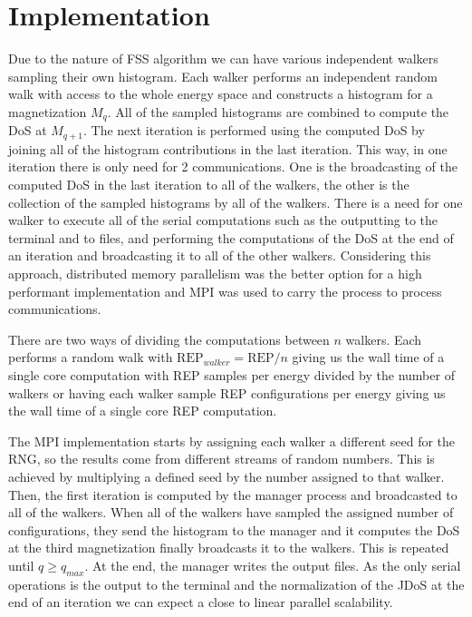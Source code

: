 \section{Implementation}

	Due to the nature of FSS algorithm we can have various independent walkers sampling their own histogram. Each walker performs an independent random walk with access to the whole energy space and constructs a histogram for a magnetization $M_q$. All of the sampled histograms are combined to compute the DoS at $M_{q+1}$. The next iteration is performed using the computed DoS by joining all of the histogram contributions in the last iteration.
This way, in one iteration there is only need for 2 communications. One is the broadcasting of the computed DoS in the last iteration to all of the walkers, the other is the collection of the sampled histograms by all of the walkers. There is a need for one walker to execute all of the serial computations such as the outputting to the terminal and to files, and performing the computations of the DoS at the end of an iteration and broadcasting it to all of the other walkers. Considering this approach, distributed memory parallelism was the better option for a high performant implementation and MPI was used to carry the process to process communications.

	There are two ways of dividing the computations between $n$ walkers. Each performs a random walk with $\text{REP}_{walker} = \text{REP} / n$ giving us the wall time of a single core computation with REP samples per energy divided by the number of walkers or having each walker sample REP configurations per energy giving us the wall time of a single core REP computation.
	
	The MPI implementation starts by assigning each walker a different seed for the RNG, so the results come from different streams of random numbers. This is achieved by multiplying a defined seed by the number assigned to that walker. Then, the first iteration is computed by the manager process and broadcasted to all of the walkers. When all of the walkers have sampled the assigned number of configurations, they send the histogram to the manager and it computes the DoS at the third magnetization finally broadcasts it to the walkers. This is repeated until $q \geqslant q_{max}$. At the end, the manager writes the output files. As the only serial operations is the output to the terminal and the normalization of the JDoS at the end of an iteration we can expect a close to linear parallel scalability.
 

